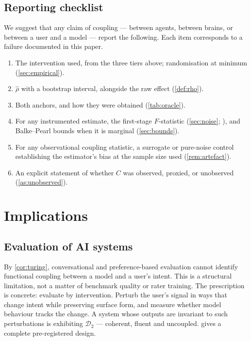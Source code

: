 \documentclass[11pt,a4paper]{article}
\theoremstyle{plain}
\theoremstyle{definition}
\theoremstyle{remark}
\newcommand{\Dy}{\mathcal{D}}
\begin{document}
\subsection{Reporting checklist}\label{sec:checklist}

We suggest that any claim of coupling --- between agents, between brains, or between a user and a model
--- report the following. Each item corresponds to a failure documented in this paper.

\begin{enumerate}[leftmargin=1.6em, itemsep=2pt]
    \item The intervention used, from the three tiers above; randomisation at minimum
    (\cref{sec:empirical}).
    \item $\hat{\rho}$ with a bootstrap interval, alongside the raw effect (\cref{def:rho}).
    \item Both anchors, and how they were obtained (\cref{tab:oracle}).
    \item For any instrumented estimate, the first-stage $F$-statistic
    (\cref{sec:noise}; \citealp{stock2005testing}), and Balke--Pearl bounds when it is marginal
    (\cref{sec:bounds}).
    \item For any observational coupling statistic, a surrogate or pure-noise control establishing the
    estimator's bias at the sample size used (\cref{rem:artefact}).
    \item An explicit statement of whether $C$ was observed, proxied, or unobserved
    (\cref{as:unobserved}).
\end{enumerate}

\section{Implications}\label{sec:implications}

\subsection{Evaluation of AI systems}
By \cref{cor:turing}, conversational and preference-based evaluation cannot identify functional coupling
between a model and a user's intent. This is a structural limitation, not a matter of benchmark quality
or rater training. The prescription is concrete: evaluate by intervention. Perturb the user's signal in
ways that change intent while preserving surface form, and measure whether model behaviour tracks the
change. A system whose outputs are invariant to such perturbations is exhibiting $\Dy_2$ --- coherent,
fluent and uncoupled.  gives a complete pre-registered design.
\end{document}
